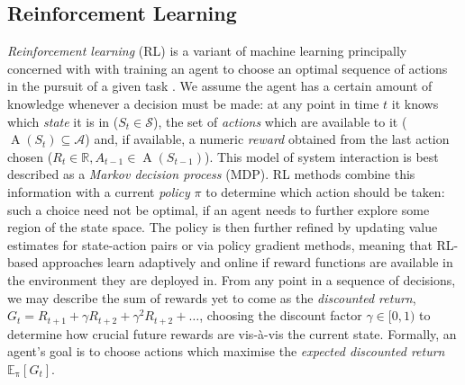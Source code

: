 \documentclass[conference, letterpaper, 10pt, times]{IEEEtran}
\begin{document}
\subsection{Reinforcement Learning}
\emph{Reinforcement learning} (RL) is a variant of machine learning principally concerned with with training an agent to choose an optimal sequence of actions in the pursuit of a given task \cite{RL2E}.
We assume the agent has a certain amount of knowledge whenever a decision must be made: at any point in time $t$ it knows which \emph{state} it is in ($S_t \in \mathcal{S}$), the set of \emph{actions} which are available to it ($\operatorname{A}(S_t) \subseteq \mathcal{A}$) and, if available, a numeric \emph{reward} obtained from the last action chosen ($R_t \in \mathbb{R}, A_{t-1} \in \operatorname{A}(S_{t-1})$).
This model of system interaction is best described as a \emph{Markov decision process} (MDP).
RL methods combine this information with a current \emph{policy} $\pi$ to determine which action should be taken: such a choice need not be optimal, if an agent needs to further explore some region of the state space.
The policy is then further refined by updating value estimates for state-action pairs or via policy gradient methods, meaning that RL-based approaches learn adaptively and online if reward functions are available in the environment they are deployed in.
From any point in a sequence of decisions, we may describe the sum of rewards yet to come as the \emph{discounted return}, $G_t = R_{t+1} + \gamma R_{t+2} + \gamma^2 R_{t+2} + \ldots$, choosing the discount factor $\gamma \in [0,1)$ to determine how crucial future rewards are vis-\`{a}-vis the current state.
Formally, an agent's goal is to choose actions which maximise the \emph{expected discounted return} $\operatorname{\mathbb{E}_{\pi}}[G_t]$.

\end{document}
